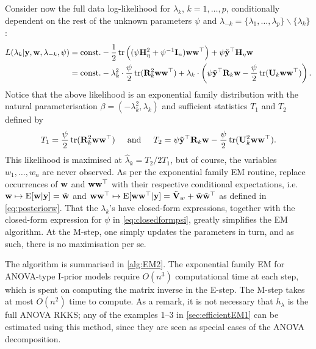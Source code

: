 Consider now the full data log-likelihood for $\lambda_k$, $k=1,\dots,p$, conditionally dependent on the rest of the unknown parameters $\psi$ and $\lambda_{-k} = \{\lambda_1,\dots,\lambda_p\} \backslash \{ \lambda_k \}$:
\begin{align}
  L(\lambda_k|\by,\bw,\lambda_{-k},\psi)
  &= \const 
  - \half \tr \Big( (
  \psi\bH_\eta^2 + \psi^{-1}\bI_n
  )\bw\bw^\top \Big)
  + \psi \tilde\by^\top \bH_\eta \bw \label{eq:logliklambdak} \\
  &= \const 
  - \lambda_k^2 \cdot \half[\psi] \tr(\bR_k^2 \bw\bw^\top)
  + \lambda_k \cdot \left( 
  \psi \tilde\by^\top \bR_k \bw - \half[\psi] \tr(\bU_k \bw\bw^\top)
  \right). \nonumber
\end{align}
Notice that the above likelihood is an exponential family distribution with the natural parameterisation $\beta = (-\lambda_k^2, \lambda_k)$ and sufficient statistics $T_1$ and $T_2$ defined by
\[
  T_1 = \half[\psi] \tr(\bR_k^2 \bw\bw^\top)
  \hspace{0.5cm}\text{and}\hspace{0.5cm}
  T_2 =  \psi\tilde\by^\top \bR_k \bw - \half[\psi]\tr(\bU_k^2 \bw\bw^\top).
\]
This likelihood is maximised at $\hat\lambda_k = T_2/2T_1$, but of course, the variables $w_1,\dots,w_n$ are never observed.
As per the exponential family EM routine, replace occurrences of $\bw$ and $\bw\bw^\top$ with their respective conditional expectations, i.e. $\bw\mapsto\E[\bw|\by] = \wtilde$ and $\bw\bw^\top\mapsto\E[\bw\bw^\top|\by] = \tilde\bV_w + \wtilde\wtilde^\top$ as defined in \cref{eq:posteriorw}.
That the $\lambda_k$'s have closed-form expressions, together with the closed-form expression for $\psi$ in \cref{eq:closedformpsi}, greatly simplifies the EM algorithm.
At the M-step, one simply updates the parameters in turn, and as such, there is no maximisation per se.

The algorithm is summarised in \cref{alg:EM2}.
The exponential family EM for ANOVA-type I-prior models require $O(n^3)$ computational time at each step, which is spent on computing the matrix inverse in the E-step.
The M-step takes at most $O(n^2)$ time to compute.
As a remark, it is not necessary that $h_\lambda$ is the full ANOVA RKKS; any of the examples 1--3 in \cref{sec:efficientEM1} can be estimated using this method, since they are seen as special cases of the ANOVA decomposition.


